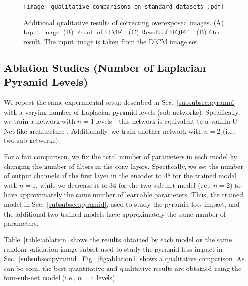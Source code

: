 \documentclass[final]{cvpr}
\begin{document}
\begin{figure*}[t]
\centering
\texttt{[image: qualitative\_comparisons\_on\_standard\_datasets\_.pdf]}
\vspace{-2mm}
\caption{Additional qualitative results of correcting overexposed images. (A) Input image. (B) Result of LIME \cite{guo2016lime, guo2017lime}. (C) Result of HQEC \cite{HQEC}. (D) Our result. 
The input image is taken from the DICM image set \cite{lee2012contrast}.}
\label{fig:qualitative_comparisons_on_DICM}
\end{figure*}






\subsection{Ablation Studies (Number of Laplacian Pyramid Levels)}

We repeat the same experimental setup described in Sec.\ \ref{subsubsec:pyramid} with a varying number of Laplacian pyramid levels (sub-networks). Specifically, we train a network with $n=1$ levels---this network is equivalent to a vanilla U-Net-like architecture \cite{unet}. Additionally, we train another network with $n=2$ (i.e., two sub-networks).


For a fair comparison, we fix the total number of parameters in each model by changing the number of filters in the conv layers. Specifically, we set the number of output channels of the first layer in the encoder to 48 for the trained model with $n=1$, while we decrease it to 34 for the two-sub-net model (i.e., $n=2$) to have approximately the same number of learnable parameters.  Thus, the trained model in Sec.\ \ref{subsubsec:pyramid}, used to study the pyramid loss impact, and the additional two trained models have approximately the same number of parameters.

Table\ \ref{table:ablation} shows the results obtained by each model on the same random validation image subset used to study the pyramid loss impact in Sec.\ \ref{subsubsec:pyramid}. Fig.\ \ref{fig:ablation1} shows a qualitative comparison. As can be seen, the best quantitative and qualitative results are obtained using the four-sub-net model  (i.e., $n=4$ levels). 




 
 
 
 
\end{document}
